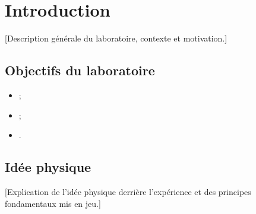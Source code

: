 \chapter{Introduction}
\label{chap:introduction}

[Description générale du laboratoire, contexte et motivation.]

\section{Objectifs du laboratoire}

\begin{itemize}[leftmargin=1.2cm]
  \item [Objectif 1] ;
  \item [Objectif 2] ;
  \item [Objectif 3].
\end{itemize}

\section{Idée physique}

[Explication de l'idée physique derrière l'expérience et des principes fondamentaux mis en jeu.]

